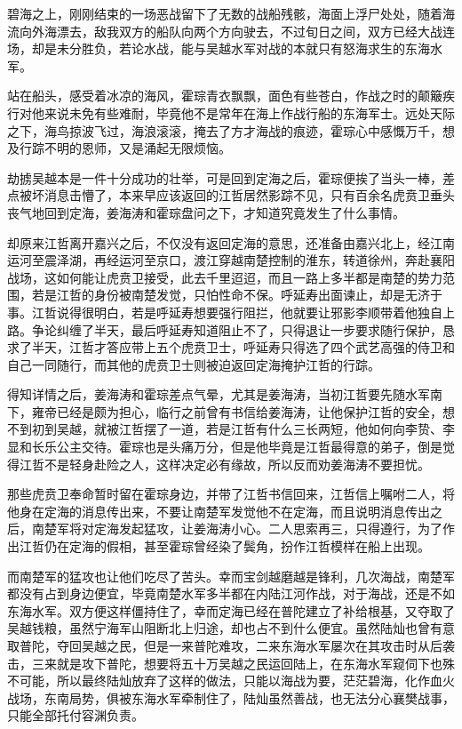 碧海之上，刚刚结束的一场恶战留下了无数的战船残骸，海面上浮尸处处，随着海流向外海漂去，敌我双方的船队向两个方向驶去，不过旬日之间，双方已经大战连场，却是未分胜负，若论水战，能与吴越水军对战的本就只有怒海求生的东海水军。

站在船头，感受着冰凉的海风，霍琮青衣飘飘，面色有些苍白，作战之时的颠簸疾行对他来说未免有些难耐，毕竟他不是常年在海上作战行船的东海军士。远处天际之下，海鸟掠波飞过，海浪滚滚，掩去了方才海战的痕迹，霍琮心中感慨万千，想及行踪不明的恩师，又是涌起无限烦恼。

劫掳吴越本是一件十分成功的壮举，可是回到定海之后，霍琮便挨了当头一棒，差点被坏消息击懵了，本来早应该返回的江哲居然影踪不见，只有百余名虎贲卫垂头丧气地回到定海，姜海涛和霍琮盘问之下，才知道究竟发生了什么事情。

却原来江哲离开嘉兴之后，不仅没有返回定海的意思，还准备由嘉兴北上，经江南运河至震泽湖，再经运河至京口，渡江穿越南楚控制的淮东，转道徐州，奔赴襄阳战场，这如何能让虎贲卫接受，此去千里迢迢，而且一路上多半都是南楚的势力范围，若是江哲的身份被南楚发觉，只怕性命不保。呼延寿出面谏止，却是无济于事。江哲说得很明白，若是呼延寿想要强行阻拦，他就要让邪影李顺带着他独自上路。争论纠缠了半天，最后呼延寿知道阻止不了，只得退让一步要求随行保护，恳求了半天，江哲才答应带上五个虎贲卫士，呼延寿只得选了四个武艺高强的侍卫和自己一同随行，而其他的虎贲卫士则被迫返回定海掩护江哲的行踪。

得知详情之后，姜海涛和霍琮差点气晕，尤其是姜海涛，当初江哲要先随水军南下，雍帝已经是颇为担心，临行之前曾有书信给姜海涛，让他保护江哲的安全，想不到初到吴越，就被江哲摆了一道，若是江哲有什么三长两短，他如何向李贽、李显和长乐公主交待。霍琮也是头痛万分，但是他毕竟是江哲最得意的弟子，倒是觉得江哲不是轻身赴险之人，这样决定必有缘故，所以反而劝姜海涛不要担忧。

那些虎贲卫奉命暂时留在霍琮身边，并带了江哲书信回来，江哲信上嘱咐二人，将他身在定海的消息传出来，不要让南楚军发觉他不在定海，而且说明消息传出之后，南楚军将对定海发起猛攻，让姜海涛小心。二人思索再三，只得遵行，为了作出江哲仍在定海的假相，甚至霍琮曾经染了鬓角，扮作江哲模样在船上出现。

而南楚军的猛攻也让他们吃尽了苦头。幸而宝剑越磨越是锋利，几次海战，南楚军都没有占到身边便宜，毕竟南楚水军多半都在内陆江河作战，对于海战，还是不如东海水军。双方便这样僵持住了，幸而定海已经在普陀建立了补给根基，又夺取了吴越钱粮，虽然宁海军山阻断北上归途，却也占不到什么便宜。虽然陆灿也曾有意取普陀，夺回吴越之民，但是一来普陀难攻，二来东海水军屡次在其攻击时从后袭击，三来就是攻下普陀，想要将五十万吴越之民运回陆上，在东海水军窥伺下也殊不可能，所以最终陆灿放弃了这样的做法，只能以海战为要，茫茫碧海，化作血火战场，东南局势，俱被东海水军牵制住了，陆灿虽然善战，也无法分心襄樊战事，只能全部托付容渊负责。

